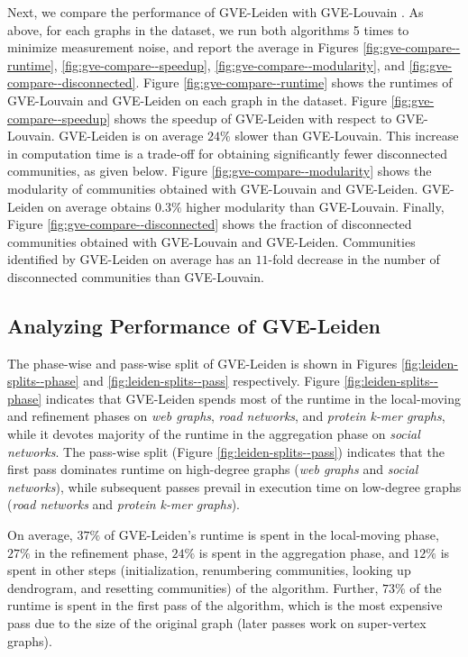 Next, we compare the performance of GVE-Leiden with GVE-Louvain \cite{sahu2023gvelouvain}. As above, for each graphs in the dataset, we run both algorithms 5 times to minimize measurement noise, and report the average in Figures \ref{fig:gve-compare--runtime}, \ref{fig:gve-compare--speedup}, \ref{fig:gve-compare--modularity}, and \ref{fig:gve-compare--disconnected}. Figure \ref{fig:gve-compare--runtime} shows the runtimes of GVE-Louvain and GVE-Leiden on each graph in the dataset. Figure \ref{fig:gve-compare--speedup} shows the speedup of GVE-Leiden with respect to GVE-Louvain. GVE-Leiden is on average $24\%$ slower than GVE-Louvain. This increase in computation time is a trade-off for obtaining significantly fewer disconnected communities, as given below. Figure \ref{fig:gve-compare--modularity} shows the modularity of communities obtained with GVE-Louvain and GVE-Leiden. GVE-Leiden on average obtains $0.3\%$ higher modularity than GVE-Louvain. Finally, Figure \ref{fig:gve-compare--disconnected} shows the fraction of disconnected communities obtained with GVE-Louvain and GVE-Leiden. Communities identified by GVE-Leiden on average has an $11$-fold decrease in the number of disconnected communities than GVE-Louvain.








\subsection{Analyzing Performance of GVE-Leiden}

The phase-wise and pass-wise split of GVE-Leiden is shown in Figures \ref{fig:leiden-splits--phase} and \ref{fig:leiden-splits--pass} respectively. Figure \ref{fig:leiden-splits--phase} indicates that GVE-Leiden spends most of the runtime in the local-moving and refinement phases on \textit{web graphs}, \textit{road networks}, and \textit{protein k-mer graphs}, while it devotes majority of the runtime in the aggregation phase on \textit{social networks}. The pass-wise split (Figure \ref{fig:leiden-splits--pass}) indicates that the first pass dominates runtime on high-degree graphs (\textit{web graphs} and \textit{social networks}), while subsequent passes prevail in execution time on low-degree graphs (\textit{road networks} and \textit{protein k-mer graphs}).

On average, $37\%$ of GVE-Leiden's runtime is spent in the local-moving phase, $27\%$ in the refinement phase, $24\%$ is spent in the aggregation phase, and $12\%$ is spent in other steps (initialization, renumbering communities, looking up dendrogram, and resetting communities) of the algorithm. Further, $73\%$ of the runtime is spent in the first pass of the algorithm, which is the most expensive pass due to the size of the original graph (later passes work on super-vertex graphs).

